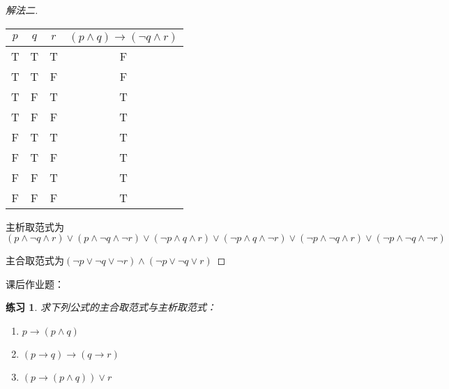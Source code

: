 \documentclass{article}
\newtheorem{Exercise}{练习}
\begin{document}
\begin{CJK*}{UTF8}{gbsn}
\begin{proof}[解法二]
    \begin{tabular}{ccc|c}
      $p$& $q$& $r$& $(p\land q)\to (\lnot q \land r)$\\
      \hline
     T& T&T&F\\
      T&T&F&F\\
      T&F&T&T\\
       T& F&F&T\\
      F&T&T&T\\
      F&T&F&T\\
     F& F&T&T\\
      F&  F&F&T\\      
    \end{tabular}

    主析取范式为$(p\land \lnot q\land r)\lor(p\land \lnot q\land \lnot r)\lor(\lnot p \land q \land r)\lor(\lnot p \land q \land \lnot r)
    \lor(\lnot p \land \lnot q\land r)\lor( \lnot p \land \lnot q\land\lnot r)
     $

    主合取范式为$ (\lnot p\lor \lnot q \lor \lnot r)\land (\lnot p\lor \lnot q \lor r)$
  \end{proof}
  课后作业题：

  \begin{Exercise}
    求下列公式的主合取范式与主析取范式：
    \begin{enumerate}
      \item $p\to (p\land q)$
      \item $(p\to q)\to (q\to r)$
      \item $(p\to (p\land q))\lor r$
    \end{enumerate}
  \end{Exercise}
\end{CJK*}
\end{document}
